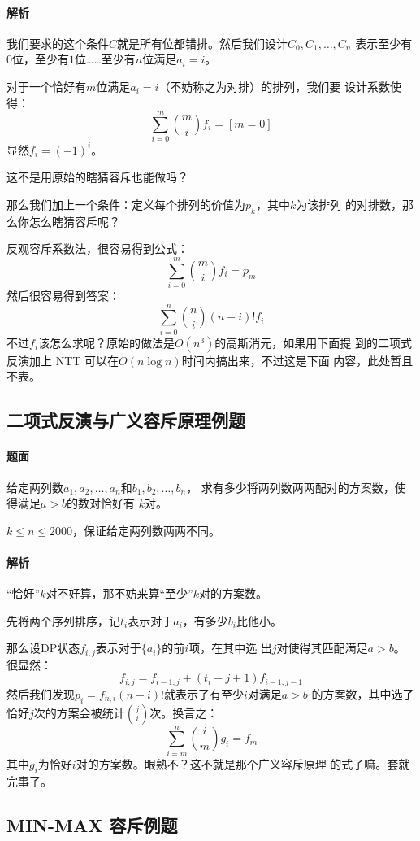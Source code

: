 \paragraph{解析}
我们要求的这个条件$C$就是所有位都错排。然后我们设计$C_0, C_1, \ldots, C_n$
表示至少有$0$位，至少有$1$位……至少有$n$位满足$a_i = i$。\par
对于一个恰好有$m$位满足$a_i = i$（不妨称之为对排）的排列，我们要
设计系数使得：
\[\sum_{i = 0}^m\binom m i f_i = [m = 0]\]
显然$f_i = (-1)^i$。\par
这不是用原始的瞎猜容斥也能做吗？\par
那么我们加上一个条件：定义每个排列的价值为$p_k$，其中$k$为该排列
的对排数，那么你怎么瞎猜容斥呢？\par
反观容斥系数法，很容易得到公式：
\[\sum_{i = 0}^m\binom m i f_i = p_m\]
然后很容易得到答案：
\[\sum_{i = 0}^n\binom n i (n - i)! f_i\]
不过$f_i$该怎么求呢？原始的做法是$O(n^3)$的高斯消元，如果用下面提
到的二项式反演加上 NTT 可以在$O(n\log n)$时间内搞出来，不过这是下面
内容，此处暂且不表。
\subsection{二项式反演与广义容斥原理例题}
\paragraph{题面}
给定两列数$a_1, a_2, \ldots, a_n$和$b_1, b_2, \ldots, b_n$，
求有多少将两列数两两配对的方案数，使得满足$a > b$的数对恰好有
$k$对。\par
$k\le n\le 2000$，保证给定两列数两两不同。
\paragraph{解析}
“恰好”$k$对不好算，那不妨来算“至少”$k$对的方案数。\par
先将两个序列排序，记$t_i$表示对于$a_i$，有多少$b_i$比他小。\par
那么设DP状态$f_{i, j}$表示对于$\{a_i\}$的前\(i\)项，在其中选
出$j$对使得其匹配满足$a > b$。很显然：
\[f_{i, j} = f_{i - 1, j} + (t_i - j + 1)f_{i - 1, j - 1}\]
然后我们发现$p_i = f_{n, i}(n - i)!$就表示了有至少$i$对满足$a > b$
的方案数，其中选了恰好$j$次的方案会被统计$\binom j i$次。换言之：
\[\sum_{i = m}^n \binom i m g_i = f_m\]
其中$g_i$为恰好$i$对的方案数。眼熟不？这不就是那个广义容斥原理
的式子嘛。套就完事了。
\subsection{MIN-MAX 容斥例题}
